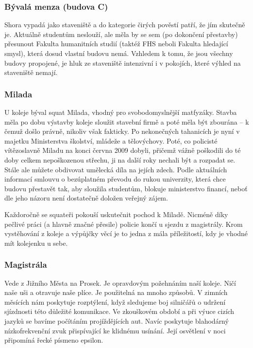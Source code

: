 \subsubsection{Bývalá menza (budova C)}
Shora vypadá jako staveniště a do kategorie čirých pověstí patří, že jím
skutečně je. Aktuálně studentům neslouží, ale měla by se sem (po dokončení
přestavby) přesunout Fakulta humanitních studií (taktéž FHS neboli Fakulta
hledající smysl), která dosud vlastní budovu nemá. Vzhledem k tomu, že jsou
všechny budovy propojené, je hluk ze staveniště intenzivní i v pokojích, které
výhled na staveniště nemají.


\subsubsection{Milada}
U koleje býval squat Milada, vhodný pro svobodomyslnější matfyzáky. Stavba měla
po dobu výstavby koleje sloužit stavební firmě a poté měla být zbourána -- k
čemuž došlo právně, nikoliv však fakticky. Po nekonečných tahanicích je nyní v
majetku Ministerstva školství, mládeže a tělovýchovy. Poté, co policisté
vítězoslavně Miladu na konci června 2009 dobyli, přičemž vážně poškodili do té
doby celkem nepoškozenou střechu, ji na další roky nechali být a rozpadat se.
Stále ale můžete obdivovat umělecká díla na jejích zdech. Podle aktuálních
informací smlouvu o bezúplatném převodu do rukou univerzity, která chce budovu
přestavět tak, aby sloužila studentům, blokuje ministerstvo financí, neboť dle
jeho názoru není dostatečně doložen veřejný zájem.

Každoročně se squateři pokouší uskutečnit pochod k Miladě. Nicméně díky pečlivé
práci (a hlavně značné přesile) policie končí u sjezdu z magistrály. Krom
vystěhování z koleje a výpůjčky věcí je to jedna z mála příležitostí, kdy je
vhodné mít kolejenku u sebe.


\subsubsection{Magistrála}
Vede z Jižního Města na Prosek. Je opravdovým požehnáním naší koleje. Ničí naše
uši a otravuje naše plíce. Je použitelná na mnoho způsobů. V zimních měsících
nám poskytuje rozptýlení, když sledujeme boj silničářů o udržení sjízdnosti této
důležité komunikace. Ve zkouškovém období a při výuce cizích jazyků se bavíme
počítáním projíždějících aut. Navíc poskytuje blahodárný nízkofrekvenční zvuk
přispívající ke klidnému usínání. Její osvětlení v noci připomíná řecké písmeno
epsilon.

